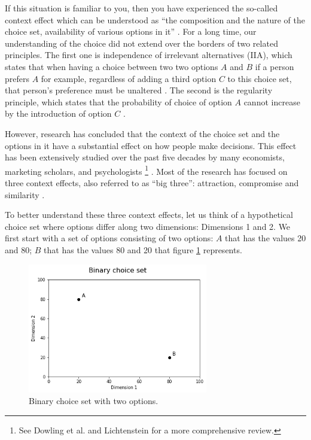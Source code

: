 \documentclass[a4paper,12pt]{article}
\newcommand{\citeyearonly}[1]{\citeyearpar{#1}}
\begin{document}
If this situation is familiar to you, then you have experienced the so-called context effect which can be understood as ``the composition and the nature of the choice set, availability of various options in it'' \citep{tversky1972elimination, huberPuto83}. For a long time, our understanding of the choice did not extend over the borders of two related principles. The first one is independence of irrelevant alternatives (IIA), which states that when having a choice between two two options $A$ and $B$ if a person prefers $A$ for example, regardless of adding a third option $C$ to this choice set, that person's preference must be unaltered \citep{luce59}. The second is the regularity principle, which states that the probability of choice of option $A$ cannot increase by the introduction of option $C$ \citep{luce59}.

However, research has concluded that the context of the choice set and the options in it have a substantial effect on how people make decisions. This effect has been extensively studied over the past five decades by many economists, marketing scholars, and psychologists \footnote{See Dowling et al. \citeyearonly{dowlingEtAl20} and Lichtenstein \citeyearonly{lichtenstein2006construction} for a more comprehensive review.} \citep{ kahnemanTversky79, simonson89, tverskySimonson93, lichtenstein2006construction, dowlingEtAl20}. Most of the research has focused on three context effects, also referred to as ``big three'': attraction, compromise and similarity \citep{howes2016contextual}.

To better understand these three context effects, let us think of a hypothetical choice set where options differ along two dimensions: Dimensions 1 and 2. We first start with a set of options consisting of two options: $A$ that has the values 20 and 80; $B$ that has the values 80 and 20 that figure \ref{fig:binaryChoiseSet} represents. 

\begin{figure}[h]
    \centering
    \includegraphics[width=0.7\textwidth]{staticFiles/noEffect.png}
    \caption{Binary choice set with two options.} %
    \label{fig:binaryChoiseSet} %

\end{figure}
\end{document}
